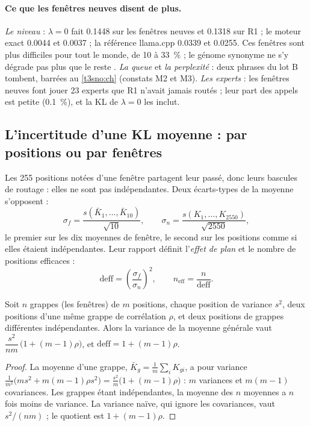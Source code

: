 \paragraph{Ce que les fenêtres neuves disent de plus.} \emph{Le niveau} : $\lambda = 0$ fait \num{0.1448} sur les fenêtres neuves et \num{0.1318} sur R1 ; le moteur exact \num{0.0044} et \num{0.0037} ; la référence llama.cpp \num{0.0339} et \num{0.0255}. Ces fenêtres sont plus difficiles pour tout le monde, de 10 à \SI{33}{\percent} ; le génome synonyme ne s'y dégrade pas plus que le reste \calc. \emph{La queue} et \emph{la perplexité} : deux phrases du lot B tombent, barrées au \cref{t3sno:ch} (constats M2 et M3). \emph{Les experts} : les fenêtres neuves font jouer 23 experts que R1 n'avait jamais routés ; leur part des appels est petite (\SI{0.1}{\percent}), et la KL de $\lambda = 0$ les inclut.

\subsection{L'incertitude d'une KL moyenne : par positions ou par fenêtres}\label{t3jug:sec:sigma}

Les 255 positions notées d'une fenêtre partagent leur passé, donc leurs bascules de routage : elles ne sont pas indépendantes. Deux écarts-types de la moyenne s'opposent :
\[
\sigma_f = \frac{s(\bar K_1, \dots, \bar K_{10})}{\sqrt{10}},
\qquad
\sigma_n = \frac{s(K_1, \dots, K_{\num{2550}})}{\sqrt{\num{2550}}},
\]
le premier sur les dix moyennes de fenêtre, le second sur les positions comme si elles étaient indépendantes. Leur rapport définit l'\emph{effet de plan} et le nombre de positions efficaces :
\[
\mathrm{deff} = \left(\frac{\sigma_f}{\sigma_n}\right)^2,\qquad n_{\text{eff}} = \frac{n}{\mathrm{deff}} .
\]

\begin{proposition}\label{t3jug:prop:deff}
Soit $n$ grappes (les fenêtres) de $m$ positions, chaque position de variance $s^2$, deux positions d'une même grappe de corrélation $\rho$, et deux positions de grappes différentes indépendantes. Alors la variance de la moyenne générale vaut $\dfrac{s^2}{nm}\,\bigl(1 + (m - 1)\rho\bigr)$, et $\mathrm{deff} = 1 + (m - 1)\rho$.
\end{proposition}
\begin{proof}
La moyenne d'une grappe, $\bar K_g = \frac1m \sum_{i} K_{gi}$, a pour variance $\frac{1}{m^2}\bigl(m s^2 + m(m-1)\rho s^2\bigr) = \frac{s^2}{m}\bigl(1 + (m-1)\rho\bigr)$ : $m$ variances et $m(m-1)$ covariances. Les grappes étant indépendantes, la moyenne des $n$ moyennes a $n$ fois moins de variance. La variance naïve, qui ignore les covariances, vaut $s^2/(nm)$ ; le quotient est $1 + (m-1)\rho$.
\end{proof}

